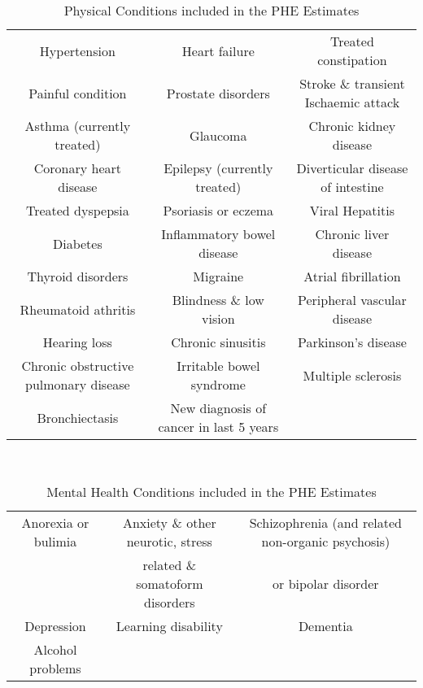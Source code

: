 \begin{table*}
    \caption{Physical Conditions included in the PHE Estimates}
    \centering
    \begin{tabular}{ccc}
        \toprule
        Hypertension & Heart failure & Treated constipation\\
        Painful condition & Prostate disorders & Stroke \& transient Ischaemic attack\\
        Asthma (currently treated) & Glaucoma & Chronic kidney disease \\
        Coronary heart disease & Epilepsy (currently treated) & Diverticular disease of intestine \\
        Treated dyspepsia & Psoriasis or eczema & Viral Hepatitis \\
        Diabetes & Inflammatory bowel disease & Chronic liver disease \\
        Thyroid disorders & Migraine & Atrial fibrillation \\
        Rheumatoid athritis & Blindness \& low vision & Peripheral vascular disease \\ 
        Hearing loss & Chronic sinusitis & Parkinson's disease \\
        Chronic obstructive pulmonary disease & Irritable bowel syndrome & Multiple sclerosis \\
        Bronchiectasis & New diagnosis of cancer in last 5 years & \ \\
        \bottomrule
    \end{tabular}
    \label{tab:op:phys_conditions}
\end{table*}
\begin{table*}
    \caption{Mental Health Conditions included in the PHE Estimates}\
    \centering
    \begin{tabular}{ccc}
        \toprule
        Anorexia or bulimia & Anxiety \& other neurotic, stress & Schizophrenia (and related non-organic psychosis) \\
        \ & related \& somatoform disorders & or bipolar disorder \\
        Depression & Learning disability & Dementia \\
        Alcohol problems & \ & \ \\
        \bottomrule
    \end{tabular}
    \label{tab:op:mh_conditions}
\end{table*}
  
